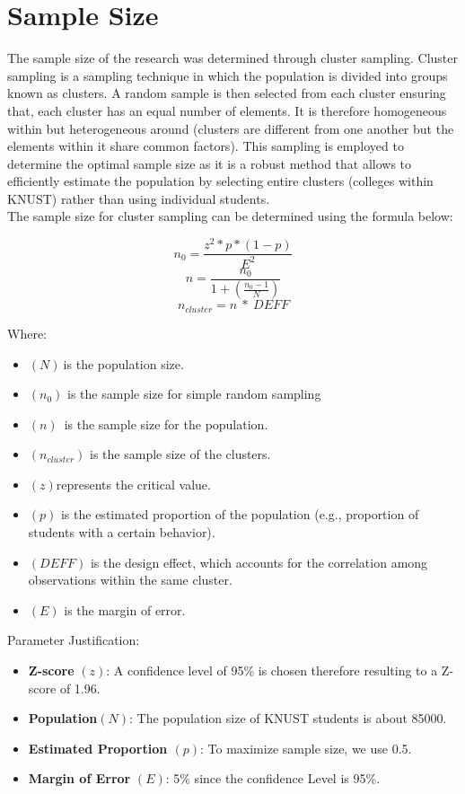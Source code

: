 \documentclass[doublespacing]{report} %
\begin{document}
\section{Sample Size}

The sample size of the research was determined through cluster sampling. Cluster sampling is a sampling technique in which the population is divided into groups known as clusters. A random sample is then selected from each cluster ensuring that, each cluster has an equal number of elements. It is therefore homogeneous within but heterogeneous around (clusters are different from one another but the elements within it share common factors). This sampling is employed to determine the optimal sample size as it is a robust method that allows to efficiently estimate the population by selecting entire clusters (colleges within KNUST) rather than using individual students.
\\The sample size for cluster sampling can be determined using the formula below:

\[n_0=\frac{z^2\ast p\ast\left(1-p\right)}{E^2}\]
\[n=\frac{n_0}{1+(\frac{n_0-1}{N})}\]
\[n_{cluster}=n\ \ast\ DEFF\]

Where:
\begin{itemize}
    \item \((N)\ \)is the population size.
    \item \((n_0)\) is the sample size for simple random sampling
    \item \((n)\)\ is the sample size for the population.
    \item \((n_{cluster})\) is the sample size of the clusters.
    \item \((z) \)represents the critical value.
    \item \((p)\) is the estimated proportion of the population (e.g., proportion of students with a certain behavior).
    \item \((DEFF) \) is the design effect, which accounts for the correlation among observations within the same cluster.
    \item \((E) \) is the margin of error.
\end{itemize}

Parameter Justification:

\begin{itemize}
    \item \textbf{Z-score} \((z)\): A confidence level of 95\% is chosen therefore resulting to a Z-score of 1.96.
    \item \textbf{Population}\( (N)\): The population size of KNUST students is about 85000.
    \item \textbf{Estimated Proportion \((p)\)}: To maximize sample size, we use 0.5.
    \item \textbf{Margin of Error }\((E)\): 5\% since the confidence Level is 95\%.


\end{itemize}
\end{document}

